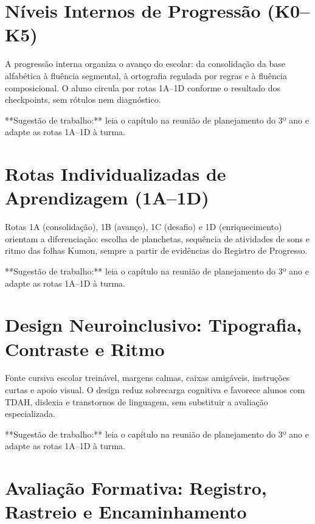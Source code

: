 \chapter{Níveis Internos de Progressão (K0–K5)}

A progressão interna organiza o avanço do escolar: da consolidação da base alfabética à fluência segmental, à ortografia regulada por regras e à fluência composicional. O aluno circula por rotas 1A–1D conforme o resultado dos checkpoints, sem rótulos nem diagnóstico.


\begin{dica}
**Sugestão de trabalho:** leia o capítulo na reunião de planejamento do 3º ano e adapte as rotas 1A–1D à turma.
\end{dica}

\chapter{Rotas Individualizadas de Aprendizagem (1A–1D)}

Rotas 1A (consolidação), 1B (avanço), 1C (desafio) e 1D (enriquecimento) orientam a diferenciação: escolha de planchetas, sequência de atividades de sons e ritmo das folhas Kumon, sempre a partir de evidências do Registro de Progresso.


\begin{dica}
**Sugestão de trabalho:** leia o capítulo na reunião de planejamento do 3º ano e adapte as rotas 1A–1D à turma.
\end{dica}

\chapter{Design Neuroinclusivo: Tipografia, Contraste e Ritmo}

Fonte cursiva escolar treinável, margens calmas, caixas amigáveis, instruções curtas e apoio visual. O design reduz sobrecarga cognitiva e favorece alunos com TDAH, dislexia e transtornos de linguagem, sem substituir a avaliação especializada.


\begin{dica}
**Sugestão de trabalho:** leia o capítulo na reunião de planejamento do 3º ano e adapte as rotas 1A–1D à turma.
\end{dica}

\chapter{Avaliação Formativa: Registro, Rastreio e Encaminhamento}

